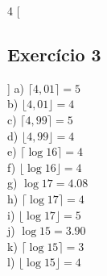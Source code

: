 \documentclass[12pt]{article}
\begin{document}
\begin{multicols}{4}
  [
    \subsection{Exercício 3}
  ]
  a) $\lceil 4,01 \rceil = 5$ \\
  b) $\lfloor 4,01 \rfloor = 4$ \\
  c) $\lceil 4,99 \rceil = 5$ \\
  d) $\lfloor 4,99 \rfloor = 4$ \\
  e) $\lceil \log{16} \rceil = 4$ \\
  f) $\lfloor \log{16} \rfloor = 4$ \\
  g) $\log{17} = 4.08$ \\
  h) $\lceil \log{17} \rceil = 4$ \\
  i) $\lfloor \log{17} \rfloor = 5$ \\
  j) $\log{15} = 3.90$ \\
  k) $\lceil \log{15} \rceil = 3$ \\
  l) $\lfloor \log{15} \rfloor = 4$ \\
  
\end{multicols}
  
\end{document}
